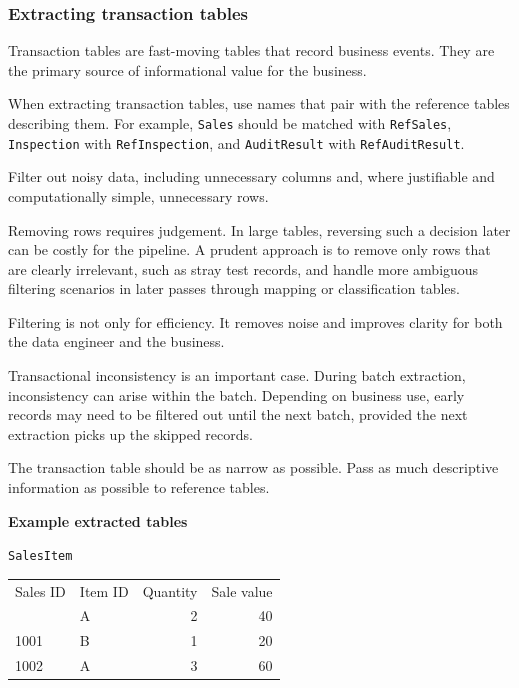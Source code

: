\documentclass[10pt,openany,10pt]{book}
\newcounter{none}
\let\podeToprule\toprule
\let\podeMidrule\midrule
\let\podeBottomrule\bottomrule
\renewcommand{\toprule}{\arrayrulecolor{pbiGrid}\podeToprule}
\renewcommand{\midrule}{\arrayrulecolor{pbiGrid}\podeMidrule}
\renewcommand{\bottomrule}{\arrayrulecolor{pbiGrid}\podeBottomrule}
\begin{document}
\subsubsection{Extracting transaction
tables}\label{extracting-transaction-tables}

Transaction tables are fast-moving tables that record business events.
They are the primary source of informational value for the business.

When extracting transaction tables, use names that pair with the
reference tables describing them. For example, \texttt{Sales} should be
matched with \texttt{RefSales}, \texttt{Inspection} with
\texttt{RefInspection}, and \texttt{AuditResult} with
\texttt{RefAuditResult}.

Filter out noisy data, including unnecessary columns and, where
justifiable and computationally simple, unnecessary rows.

Removing rows requires judgement. In large tables, reversing such a
decision later can be costly for the pipeline. A prudent approach is to
remove only rows that are clearly irrelevant, such as stray test
records, and handle more ambiguous filtering scenarios in later passes
through mapping or classification tables.

Filtering is not only for efficiency. It removes noise and improves
clarity for both the data engineer and the business.

Transactional inconsistency is an important case. During batch
extraction, inconsistency can arise within the batch. Depending on
business use, early records may need to be filtered out until the next
batch, provided the next extraction picks up the skipped records.

The transaction table should be as narrow as possible. Pass as much
descriptive information as possible to reference tables.

\textbf{Example extracted tables}

\texttt{SalesItem}

{\def\LTcaptype{none} %
\begin{longtable}[]{@{}llrr@{}}
\toprule\noalign{}
Sales ID & Item ID & Quantity & Sale value \\
\midrule\noalign{}
\endhead
\bottomrule\noalign{}
\endlastfoot
1001 & A & 2 & 40 \\
1001 & B & 1 & 20 \\
1002 & A & 3 & 60 \\
\end{longtable}
}
\end{document}

